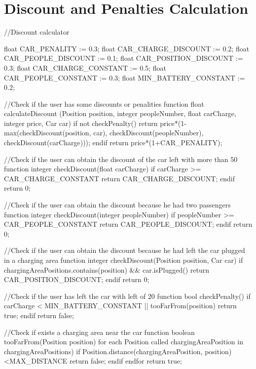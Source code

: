 \documentclass[11pt,a4paper]{report}
\begin{document}
\section{Discount and Penalties Calculation}
\begin{pseudocodeEnv}
//Discount calculator

float CAR_PENALITY := 0.3;
float CAR_CHARGE_DISCOUNT := 0.2;
float CAR_PEOPLE_DISCOUNT := 0.1;
float CAR_POSITION_DISCOUNT := 0.3;
float CAR_CHARGE_CONSTANT := 0.5;
float CAR_PEOPLE_CONSTANT := 0.3;
float MIN_BATTERY_CONSTANT := 0.2;

//Check if the user has some discounts or penalities
function float calculateDiscount (Position position, integer peopleNumber, float carCharge, integer price, Car car){
	if not checkPenalty()
		return price*(1-max(checkDiscount(position, car), checkDiscount(peopleNumber), checkDiscount(carCharge)));
	endif
	return price*(1+CAR_PENALITY);
}

//Check if the user can obtain the discount of the car left with more than 50%
function integer checkDiscount(float carCharge){
	if carCharge >= CAR_CHARGE_CONSTANT
		return CAR_CHARGE_DISCOUNT;
	endif
	return 0;
}

//Check if the user can obtain the discount because he had two passengers
function integer checkDiscount(integer peopleNumber){
	if peopleNumber >= CAR_PEOPLE_CONSTANT
		return CAR_PEOPLE_DISCOUNT;
	endif
	return 0;
}

//Check if the user can obtain the discount because he had left the car plugged in a charging area
function integer checkDiscount(Position position, Car car){
	if chargingAreaPositions.contains(position) && car.isPlugged()
		return CAR_POSITION_DISCOUNT;
	endif
	return 0;
}

//Check if the user has left the car with left of 20%
function bool checkPenalty(){
	if carCharge < MIN_BATTERY_CONSTANT || tooFarFrom(position)
		return true;
	endif
	return false;
}

//Check if exists a charging area near the car
function boolean tooFarFrom(Position position){
	for each Position called chargingAreaPosition in chargingAreaPositions)
		if Position.distance(chargingAreaPosition, position)<MAX_DISTANCE
			return false;
		endif
	endfor
	return true;
}
\end{pseudocodeEnv}
\end{document}
